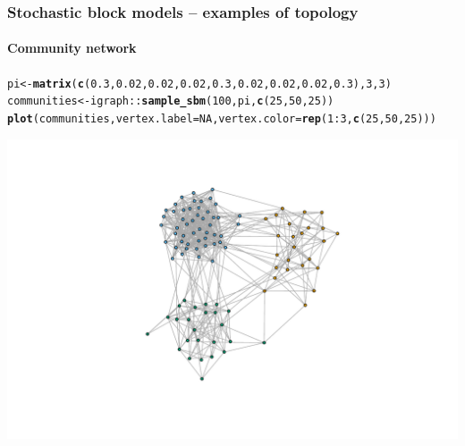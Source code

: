 \documentclass{beamer}\usepackage[]{graphicx}\usepackage[]{color}
\makeatletter
\newcommand{\hlnum}[1]{\textcolor[rgb]{0.686,0.059,0.569}{#1}}%
\newcommand{\hlopt}[1]{\textcolor[rgb]{0,0,0}{#1}}%
\newcommand{\hlstd}[1]{\textcolor[rgb]{0.345,0.345,0.345}{#1}}%
\newcommand{\hlkwb}[1]{\textcolor[rgb]{0.69,0.353,0.396}{#1}}%
\newcommand{\hlkwc}[1]{\textcolor[rgb]{0.333,0.667,0.333}{#1}}%
\newcommand{\hlkwd}[1]{\textcolor[rgb]{0.737,0.353,0.396}{\textbf{#1}}}%
\newenvironment{kframe}{%
 \def\at@end@of@kframe{}%
 \ifinner\ifhmode%
  \def\at@end@of@kframe{\end{minipage}}%
  \begin{minipage}{\columnwidth}%
 \fi\fi%
 \def\FrameCommand##1{\hskip\@totalleftmargin \hskip-\fboxsep
 \colorbox{shadecolor}{##1}\hskip-\fboxsep
     \hskip-\linewidth \hskip-\@totalleftmargin \hskip\columnwidth}%
 \MakeFramed {\advance\hsize-\width
   \@totalleftmargin\z@ \linewidth\hsize
   \@setminipage}}%
 {\par\unskip\endMakeFramed%
 \at@end@of@kframe}
\newenvironment{knitrout}{}{} %
\makeatother
\begin{document}
\begin{frame}[fragile]
  \frametitle{Stochastic block models -- examples of topology}
  \framesubtitle{Community network}

\begin{knitrout}\scriptsize
{}\color{fgcolor}\begin{kframe}
\begin{alltt}
\hlstd{pi} \hlkwb{<-} \hlkwd{matrix}\hlstd{(}\hlkwd{c}\hlstd{(}\hlnum{0.3}\hlstd{,}\hlnum{0.02}\hlstd{,}\hlnum{0.02}\hlstd{,}\hlnum{0.02}\hlstd{,}\hlnum{0.3}\hlstd{,}\hlnum{0.02}\hlstd{,}\hlnum{0.02}\hlstd{,}\hlnum{0.02}\hlstd{,}\hlnum{0.3}\hlstd{),}\hlnum{3}\hlstd{,}\hlnum{3}\hlstd{)}
\hlstd{communities} \hlkwb{<-} \hlstd{igraph}\hlopt{::}\hlkwd{sample_sbm}\hlstd{(}\hlnum{100}\hlstd{, pi,} \hlkwd{c}\hlstd{(}\hlnum{25}\hlstd{,} \hlnum{50}\hlstd{,} \hlnum{25}\hlstd{))}
\hlkwd{plot}\hlstd{(communities,} \hlkwc{vertex.label}\hlstd{=}\hlnum{NA}\hlstd{,} \hlkwc{vertex.color} \hlstd{=} \hlkwd{rep}\hlstd{(}\hlnum{1}\hlopt{:}\hlnum{3}\hlstd{,}\hlkwd{c}\hlstd{(}\hlnum{25}\hlstd{,} \hlnum{50}\hlstd{,} \hlnum{25}\hlstd{)))}
\end{alltt}
\end{kframe}
\includegraphics[width=.8\textwidth]{figures/unnamed-chunk-5-1} 

\end{knitrout}

\end{frame}
\end{document}
